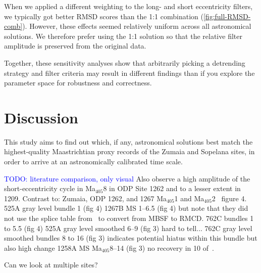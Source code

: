 \documentclass[draft]{agujournal2019}
\newcommand{\appr}{\raise.17ex\hbox{\(\scriptstyle\sim\)}} %
\newcommand{\ma}[1]{Ma\(_{405}\)#1} %
\newcommand{\ijk}{\textcolor{blue}}
\begin{document}
When we applied a different weighting to the long- and short eccentricity filters, we typically got better \gls{RMSD} scores than the 1:1 combination (\cref{fig:full-RMSD-comb}).
However, these effects seemed relatively uniform across all astronomical solutions.
We therefore prefer using the 1:1 solution so that the relative filter amplitude is preserved from the original data.

Together, these sensitivity analyses show that arbitrarily picking a detrending strategy and filter criteria may result in different findings than if you explore the parameter space for robustness and correctness.



\section{Discussion}\label{sec:discussion}

This study aims to find out which, if any, astronomical solutions best match the highest-quality Maastrichtian proxy records of the Zumaia and Sopelana sites, in order to arrive at an astronomically calibrated time scale.


\ijk{TODO: literature comparison, only visual}
Also observe a high amplitude of the short-eccentricity cycle in \ma{8} in ODP Site 1262 and to a lesser extent in 1209.
Contrast to: Zumaia, ODP 1262, and 1267 \ma{1} and \ma{2}~\cite{Westerhold2008} figure 4.
525A gray level bundle 1 (fig 4)
1267B MS 1--6.5 (fig 4) but note that they did not use the splice table from~\cite{Westerhold2008} to convert from MBSF to RMCD.
762C bundles 1 to 5.5 (fig 4)
525A gray level smoothed 6--9 (fig 3) hard to tell...
762C gray level smoothed bundles 8 to 16 (fig 3) indicates potential hiatus within this bundle but also high change
1258A MS \ma{8--14} (fig 3) no recovery in 10
of~.

Can we look at multiple sites?
\end{document}
